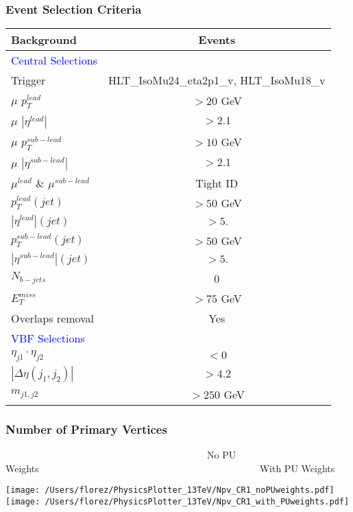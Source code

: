 \documentclass{beamer}
\begin{document}

\begin{frame}
\frametitle{Event Selection Criteria}

\begin{table}[htbp]
\tiny{
\begin{center}
\begin{tabular}{lc}\hline\hline

Background & Events \\

 \hline 
 \textcolor{blue}{Central Selections} & \\
 \hline 
  Trigger & HLT\_IsoMu24\_eta2p1\_v, HLT\_IsoMu18\_v \\
  $\mu$  $p^{lead}_{T}$ & $> 20$ GeV \\
  $\mu$  $|\eta^{lead}|$  & $ > 2.1$\\
  $\mu$ $p^{sub-lead}_{T}$ & $ > 10$ GeV \\
  $\mu$  $|\eta^{sub-lead}| $ & $> 2.1$\\
  $\mu^{lead}$ \& $\mu^{sub-lead}$ & Tight ID \\
  $p^{lead}_{T} (jet)$ & $> 50$ GeV \\
  $|\eta^{lead}| (jet)$ & $> 5.$  \\
  $p^{sub-lead}_{T} (jet)$ & $> 50$ GeV \\
  $|\eta^{sub-lead}| (jet)$ & $> 5.$  \\
  $N_{b-jets}$ & 0 \\
  $E^{miss}_{T}$ & $> 75$ GeV \\
  Overlaps removal & Yes \\ 
  \hline 
  \textcolor{blue}{VBF Selections} & \\
   \hline 
  $\eta_{j1} \cdot \eta_{j2}$ & $< 0$ \\
  $|\Delta \eta(j_{1}, j_{2})|$ & $> 4.2$ \\
  $m_{j1, j2}$ & $> 250$ GeV \\
  
   
 \hline 
 
 \end{tabular}
\end{center}
}
\end{table}

\end{frame}




\begin{frame}
\frametitle{Number of Primary Vertices}
\tiny{~~~~~~~~~~~~~~~~~~~~~~~~~~~~~~~~~~~~~~~~~~No PU Weights~~~~~~~~~~~~~~~~~~~~~~~~~~~~~~~~~~~~~~~~~~~~~~With PU Weights}\\
\begin{center}
 
   \texttt{[image: /Users/florez/PhysicsPlotter\_13TeV/Npv\_CR1\_noPUweights.pdf]}
  \texttt{[image: /Users/florez/PhysicsPlotter\_13TeV/Npv\_CR1\_with\_PUweights.pdf]}
  
 
\end{center}

\end{frame}
\end{document}
